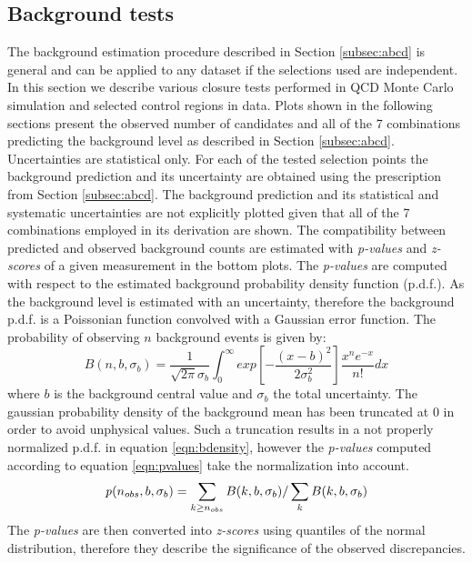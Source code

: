 \subsection{Background tests}
\label{subsec:backgroundtests}
The background estimation procedure described in Section \ref{subsec:abcd} is general and can be applied
to any dataset if the selections used are independent.
In this section we describe various closure tests performed in QCD Monte Carlo simulation and 
selected control regions in data. Plots shown in the following sections present the observed number
of candidates and all of the 7 combinations predicting the background level as described
 in Section \ref{subsec:abcd}.
Uncertainties are statistical only. For each of the tested selection points the background prediction 
and its uncertainty are obtained 
using the prescription from Section \ref{subsec:abcd}. The background prediction and its statistical 
and systematic uncertainties are
 not explicitly plotted given that all of the 7 combinations employed in its derivation are shown.  
The compatibility between predicted and observed background counts 
are estimated with {\it p-values} and {\it z-scores} of a given measurement in the bottom plots. The {\it p-values}
are computed with respect to the estimated background probability density function (p.d.f.). 
As the background level is estimated
with an uncertainty, therefore the background p.d.f. is a Poissonian function convolved  
with a Gaussian error function. The probability of observing $n$ background events is given by:
\begin{equation}
B(n,b,\sigma_b)= \frac{1}{\sqrt{2\pi}\sigma_b} \int_{0}^{\infty} 
exp\left[ -\frac{\left(x-b\right)^2}{2\sigma_b^2}\right]\frac{x^n e^{-x}}{n!}dx
\label{eqn:bdensity}
\end{equation}
where $b$ is the background central value and $\sigma_b$ the total uncertainty.
The gaussian probability density of the background mean has been truncated at 
0 in order to avoid unphysical values. Such a truncation results in a not properly normalized p.d.f. in equation 
\ref{eqn:bdensity}, however the {\it p-values} computed according to equation \ref{eqn:pvalues} take the 
normalization into account.   
\begin{equation}
{\it p} (n_{obs},b,\sigma_b) = \sum_{k\geq n_{obs}} B(k,b,\sigma_b) / \sum_{k} B(k,b,\sigma_b)
\label{eqn:pvalues}
\end{equation}
The {\it p-values} are then converted into {\it z-scores} using quantiles of the normal
 distribution, therefore they describe the significance of the observed discrepancies. 

